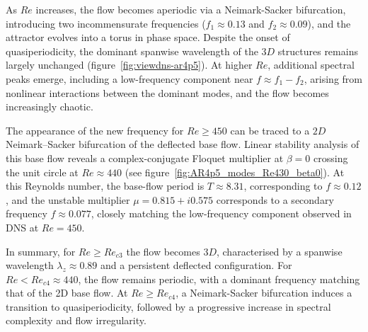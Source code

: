 As $Re$ increases, the flow becomes aperiodic via a Neimark-Sacker bifurcation, introducing two incommensurate frequencies ($f_1 \approx 0.13$ and $f_2 \approx 0.09$), and the attractor evolves into a torus in phase space. Despite the onset of quasiperiodicity, the dominant spanwise wavelength of the $3D$ structures remains largely unchanged (figure~\ref{fig:viewdns-ar4p5}). At higher $Re$, additional spectral peaks emerge, including a low-frequency component near $f \approx f_1 - f_2$, arising from nonlinear interactions between the dominant modes, and the flow becomes increasingly chaotic.

The appearance of the new frequency for $Re \ge 450$ can be traced to a $2D$ Neimark–Sacker bifurcation of the deflected base flow. Linear stability analysis of this base flow reveals a complex-conjugate Floquet multiplier at $\beta = 0$ crossing the unit circle at $Re \approx 440$ (see figure~\ref{fig:AR4p5_modes_Re430_beta0}). At this Reynolds number, the base-flow period is $T \approx 8.31$, corresponding to $f \approx 0.12$, and the unstable multiplier $\mu = 0.815 + i 0.575$ corresponds to a secondary frequency $f \approx 0.077$, closely matching the low-frequency component observed in DNS at $Re = 450$.

In summary, for $Re \ge Re_{c3}$ the flow becomes $3D$, characterised by a spanwise wavelength $\lambda_z \approx 0.89$ and a persistent deflected configuration. For $Re < Re_{c4} \approx 440$, the flow remains periodic, with a dominant frequency matching that of the 2D base flow. At $Re \ge Re_{c4}$, a Neimark-Sacker bifurcation induces a transition to quasiperiodicity, followed by a progressive increase in spectral complexity and flow irregularity.


